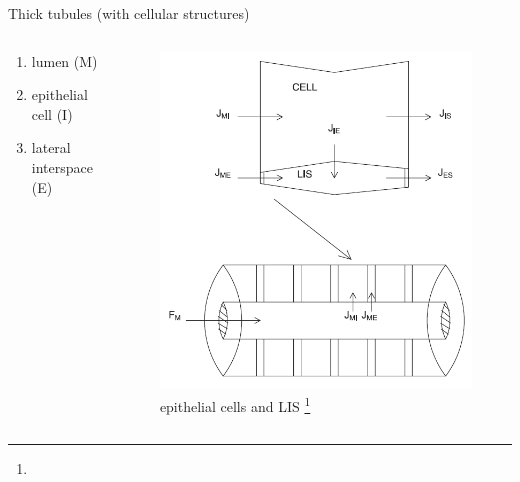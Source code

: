 \documentclass{beamer}
\begin{document}
\begin{frame}{Thick tubules (with cellular structures)}
    \begin{columns}
        \begin{column}{0.45\linewidth}
            \begin{enumerate}
                \item lumen (M)
                \item epithelial cell (I)
                \item lateral interspace (E)
            \end{enumerate}
        \end{column}

        \begin{column}{0.55\linewidth}
            \begin{figure}
                \centering
                \includegraphics[width=.75\textwidth]{figures/epithelium.png}
                \caption{epithelial cells and LIS \citep{Weinstein1998}\footnote[frame,1]{\tiny{}}}
            \end{figure}
        \end{column}
    \end{columns}
\end{frame}
\end{document}
